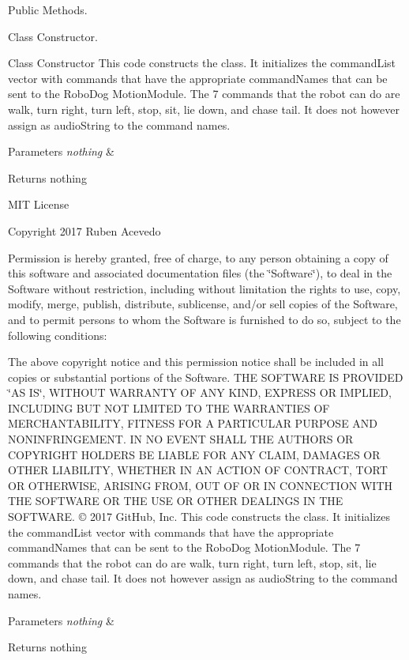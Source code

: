Public Methods. 

Class Constructor.

Class Constructor This code constructs the class. It initializes the command\+List vector with commands that have the appropriate command\+Names that can be sent to the Robo\+Dog Motion\+Module. The 7 commands that the robot can do are walk, turn right, turn left, stop, sit, lie down, and chase tail. It does not however assign as audio\+String to the command names. 
\begin{DoxyParams}{Parameters}
{\em nothing} & \\
\hline
\end{DoxyParams}
\begin{DoxyReturn}{Returns}
nothing
\end{DoxyReturn}
M\+IT License

Copyright 2017 Ruben Acevedo

Permission is hereby granted, free of charge, to any person obtaining a copy of this software and associated documentation files (the \char`\"{}\+Software\char`\"{}), to deal in the Software without restriction, including without limitation the rights to use, copy, modify, merge, publish, distribute, sublicense, and/or sell copies of the Software, and to permit persons to whom the Software is furnished to do so, subject to the following conditions\+:

The above copyright notice and this permission notice shall be included in all copies or substantial portions of the Software. T\+HE S\+O\+F\+T\+W\+A\+RE IS P\+R\+O\+V\+I\+D\+ED \char`\"{}\+A\+S I\+S\char`\"{}, W\+I\+T\+H\+O\+UT W\+A\+R\+R\+A\+N\+TY OF A\+NY K\+I\+ND, E\+X\+P\+R\+E\+SS OR I\+M\+P\+L\+I\+ED, I\+N\+C\+L\+U\+D\+I\+NG B\+UT N\+OT L\+I\+M\+I\+T\+ED TO T\+HE W\+A\+R\+R\+A\+N\+T\+I\+ES OF M\+E\+R\+C\+H\+A\+N\+T\+A\+B\+I\+L\+I\+TY, F\+I\+T\+N\+E\+SS F\+OR A P\+A\+R\+T\+I\+C\+U\+L\+AR P\+U\+R\+P\+O\+SE A\+ND N\+O\+N\+I\+N\+F\+R\+I\+N\+G\+E\+M\+E\+NT. IN NO E\+V\+E\+NT S\+H\+A\+LL T\+HE A\+U\+T\+H\+O\+RS OR C\+O\+P\+Y\+R\+I\+G\+HT H\+O\+L\+D\+E\+RS BE L\+I\+A\+B\+LE F\+OR A\+NY C\+L\+A\+IM, D\+A\+M\+A\+G\+ES OR O\+T\+H\+ER L\+I\+A\+B\+I\+L\+I\+TY, W\+H\+E\+T\+H\+ER IN AN A\+C\+T\+I\+ON OF C\+O\+N\+T\+R\+A\+CT, T\+O\+RT OR O\+T\+H\+E\+R\+W\+I\+SE, A\+R\+I\+S\+I\+NG F\+R\+OM, O\+UT OF OR IN C\+O\+N\+N\+E\+C\+T\+I\+ON W\+I\+TH T\+HE S\+O\+F\+T\+W\+A\+RE OR T\+HE U\+SE OR O\+T\+H\+ER D\+E\+A\+L\+I\+N\+GS IN T\+HE S\+O\+F\+T\+W\+A\+RE. © 2017 Git\+Hub, Inc. This code constructs the class. It initializes the command\+List vector with commands that have the appropriate command\+Names that can be sent to the Robo\+Dog Motion\+Module. The 7 commands that the robot can do are walk, turn right, turn left, stop, sit, lie down, and chase tail. It does not however assign as audio\+String to the command names. 
\begin{DoxyParams}{Parameters}
{\em nothing} & \\
\hline
\end{DoxyParams}
\begin{DoxyReturn}{Returns}
nothing 
\end{DoxyReturn}


